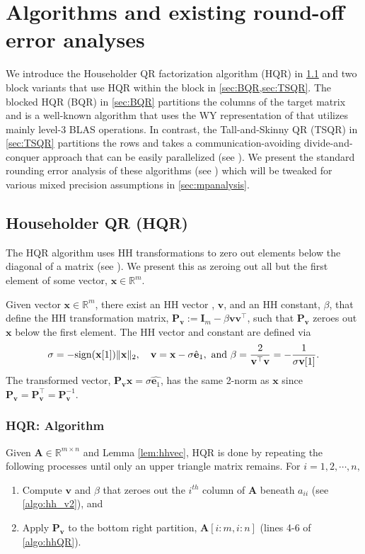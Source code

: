 \documentclass[review,onefignum,onetabnum]{siamart190516}
\newcommand{\R}{\mathbb{R}}
\newcommand{\bb}[1]{\mathbf{#1}}
\begin{document}
\section{Algorithms and existing round-off error analyses}\label{sec:algo}
%
We introduce the Householder QR factorization algorithm (HQR) in \cref{sec:HQR} and two block variants that use HQR within the block in \cref{sec:BQR,sec:TSQR}. 
The blocked HQR (BQR) in \cref{sec:BQR} partitions the columns of the target matrix and is a well-known algorithm that uses the WY representation of \cite{Bischof1987} that utilizes mainly level-3 BLAS operations.
In contrast, the Tall-and-Skinny QR (TSQR) in \cref{sec:TSQR} partitions the rows and takes a communication-avoiding divide-and-conquer approach that can be easily parallelized (see \cite{Demmel2007}).
We present the standard rounding error analysis of these algorithms (see \cite{Higham2002,Mori2012}) which will be tweaked for various mixed precision assumptions in \cref{sec:mpanalysis}.
%
\subsection{Householder QR (HQR)}\label{sec:HQR}
The HQR algorithm uses HH transformations to zero out elements below the diagonal of a matrix (see \cite{Householder1958}). 
We present this as zeroing out all but the first element of some vector, $\bb{x}\in\R^m$.
\begin{lemma}
	Given vector $\bb{x}\in\R^{m}$, there exist an HH vector , $\bb{v}$, and an HH constant, $\beta$, that define the HH transformation matrix, $\bb{P}_{\bb{v}}:=\bb{I}_{m} - \beta \bb{v}\bb{v}^{\top}$, such that $\bb{P}_{\bb{v}}$ zeroes out $\bb{x}$ below the first element. 
	The HH vector and constant are defined via
	\begin{equation}
	\sigma = -\rm{sign}(\bb{x}[1])\|\bb{x}\|_2, \quad  \bb{v} = \bb{x} -\sigma \hat{\bb{e}}_{1},\mbox{ and } \beta =\frac{2}{\bb{v}^{\top}\bb{v}}=-\frac{1}{\sigma\bb{v}[1]}.
	\label{eqn:HH} 
	\vspace*{-.3cm}
	\end{equation}
	The transformed vector, $\bb{P_vx}=\sigma\hat{\bb{e}_1}$, has the same 2-norm as $\bb{x}$ since $\bb{P}_{\bb{v}}=\bb{P}_{\bb{v}}^{\top}=\bb{P}_{\bb{v}}^{-1}$.
	\label{lem:hhvec}
\end{lemma}
\subsubsection{HQR: Algorithm}
Given $\bb{A}\in\R^{m\times n}$ and Lemma \ref{lem:hhvec}, HQR is done by repeating the following processes until only an upper triangle matrix remains.
For $i = 1, 2, \cdots, n,$
\begin{enumerate}[Step 1)]
	\item Compute $\bb{v}$ and $\beta$ that zeroes out the $i^{th}$ column of $\bb{A}$ beneath $a_{ii}$ (see \cref{algo:hh_v2}), and
	\item Apply $\bb{P}_{\bb{v}}$ to the bottom right partition, $\bb{A}[i:m, i:n]$ (lines 4-6 of \cref{algo:hhQR}).
\end{enumerate}
\end{document}
